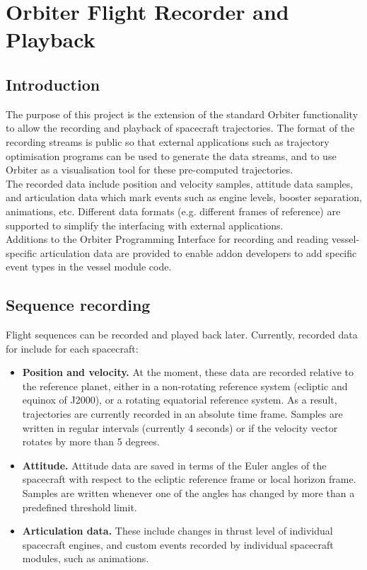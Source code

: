 \documentclass[Orbiter Technical Reference.tex]{subfiles}
\begin{document}
\section{Orbiter Flight Recorder and Playback}

\subsection{Introduction}
The purpose of this project is the extension of the standard Orbiter functionality to allow the recording and playback of spacecraft trajectories. The format of the recording streams is public so that external applications such as trajectory optimisation programs can be used to generate the data streams, and to use Orbiter as a visualisation tool for these pre-computed trajectories.\\
The recorded data include position and velocity samples, attitude data samples, and articulation data which mark events such as engine levels, booster separation, animations, etc. Different data formats (e.g. different frames of reference) are supported to simplify the interfacing with external applications.\\
Additions to the Orbiter Programming Interface for recording and reading vessel-specific articulation data are provided to enable addon developers to add specific event types in the vessel module code.


\subsection{Sequence recording}
Flight sequences can be recorded and played back later. Currently, recorded data for include for each spacecraft:

\begin{itemize}
\item \textbf{Position and velocity.} At the moment, these data are recorded relative to the reference planet, either in a non-rotating reference system (ecliptic and equinox of J2000), or a rotating equatorial reference system. As a result, trajectories are currently recorded in an absolute time frame. Samples are written in regular intervals (currently 4 seconds) or if the velocity vector rotates by more than 5 degrees.
\item \textbf{Attitude.} Attitude data are saved in terms of the Euler angles of the spacecraft with respect to the ecliptic reference frame or local horizon frame. Samples are written whenever one of the angles has changed by more than a predefined threshold limit.
\item \textbf{Articulation data.} These include changes in thrust level of individual spacecraft engines, and custom events recorded by individual spacecraft modules, such as animations.
\end{itemize}
\end{document}
